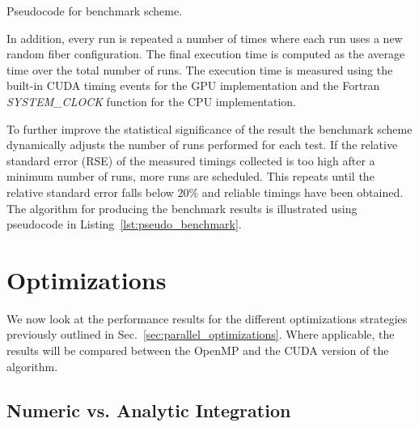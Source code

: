 \begin{listing}[htbp]
  \centering
  \inputminted[mathescape,
    linenos,
    numbersep=5pt,
    fontsize=\footnotesize,
    frame=lines,
    framesep=2mm]{c}{lst/benchmark_scheme.lst}
  \caption{Pseudocode for benchmark scheme.}
  \vspace{-1.25em}
  \label{lst:pseudo_benchmark}
\end{listing}

In addition, every run is repeated a number of times where each run uses a new random fiber configuration. The final execution time is computed as the average time over the total number of runs. The execution time is measured using the built-in CUDA timing events for the GPU implementation and the Fortran \emph{SYSTEM\_CLOCK} function for the CPU implementation.

To further improve the statistical significance of the result the benchmark scheme dynamically adjusts the number of runs performed for each test. If the relative standard error (RSE) of the measured timings collected is too high after a minimum number of runs, more runs are scheduled. This repeats until the relative standard error falls below $20\%$ and reliable timings have been obtained.  The algorithm for producing the benchmark results is illustrated using pseudocode in Listing~\ref{lst:pseudo_benchmark}. 

\section{Optimizations}
\label{sec:bench_optimization}

We now look at the performance results for the different optimizations strategies previously outlined in Sec.~\ref{sec:parallel_optimizations}. Where applicable, the results will be compared between the OpenMP and the CUDA version of the algorithm.

\subsection{Numeric vs. Analytic Integration}
\label{subsec:bench_numeric_vs_analytic}

